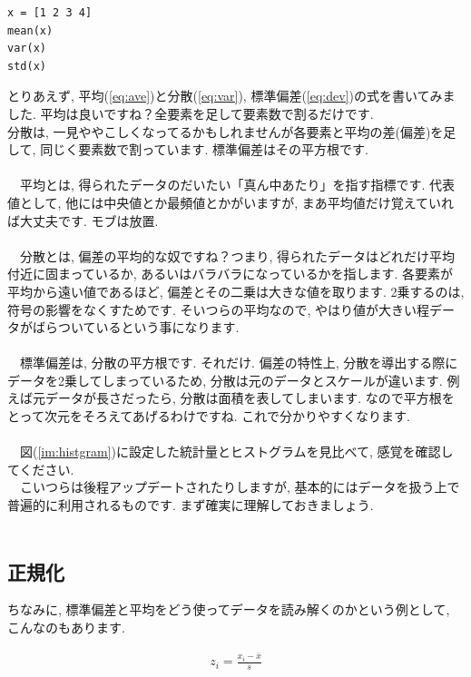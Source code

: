 \documentclass[11pt,a4paper,uplatex]{ujreport}
\begin{document}
\begin{lstlisting}[caption=式(\ref{eq:ave}\ref{eq:var}\ref{eq:dev})のコード,label=stat]
x = [1 2 3 4]
mean(x)
var(x)
std(x)
\end{lstlisting}


とりあえず, 平均(\ref{eq:ave})と分散(\ref{eq:var}), 標準偏差(\ref{eq:dev})の式を書いてみました. 平均は良いですね？全要素を足して要素数で割るだけです.\\
分散は, 一見ややこしくなってるかもしれませんが各要素と平均の差(偏差)を足して, 同じく要素数で割っています. 標準偏差はその平方根です.\\
\\
　平均とは, 得られたデータのだいたい「真ん中あたり」を指す指標です. 代表値として, 他には中央値とか最頻値とかがいますが, まあ平均値だけ覚えていれば大丈夫です. モブは放置.\\
\\
　分散とは, 偏差の平均的な奴ですね？つまり, 得られたデータはどれだけ平均付近に固まっているか, あるいはバラバラになっているかを指します. 各要素が平均から遠い値であるほど, 偏差とその二乗は大きな値を取ります. 2乗するのは, 符号の影響をなくすためです. そいつらの平均なので, やはり値が大きい程データがばらついているという事になります.\\
\\
　標準偏差は, 分散の平方根です. それだけ. 偏差の特性上, 分散を導出する際にデータを2乗してしまっているため, 分散は元のデータとスケールが違います. 例えば元データが長さだったら, 分散は面積を表してしまいます. なので平方根をとって次元をそろえてあげるわけですね. これで分かりやすくなります.\\
\\
　図(\ref{im:histgram})に設定した統計量とヒストグラムを見比べて, 感覚を確認してください.
\\
　こいつらは後程アップデートされたりしますが, 基本的にはデータを扱う上で普遍的に利用されるものです. まず確実に理解しておきましょう.\\
\\

\subsection{正規化}
ちなみに, 標準偏差と平均をどう使ってデータを読み解くのかという例として, こんなのもあります.

\begin{eqnarray}
\label{eq:normalize}
z_i = \frac{x_i - \bar{x}}{s}
\end{eqnarray}
\end{document}
